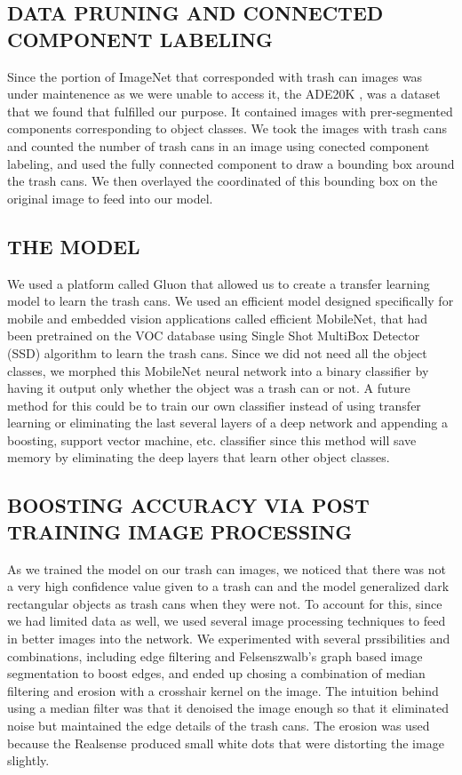 \documentclass{article}
\begin{document}
\subsection{DATA PRUNING AND CONNECTED COMPONENT LABELING}
\label{ssec:dataprune}

Since the portion of ImageNet that corresponded with trash can images was under maintenence as we were unable to access it, the ADE20K \cite{zhou2017scene}, was a dataset that we found that fulfilled our purpose. It contained images with prer-segmented components corresponding to object classes. We took the images with trash cans and counted the number of trash cans in an image using conected component labeling, and used the fully connected component to draw a bounding box around the trash cans. We then overlayed the coordinated of this bounding box on the original image to feed into our model. 

\subsection{THE MODEL}
\label{ssec:themodel}
We used a platform called Gluon \cite{gluoncvnlp2019} that allowed us to create a transfer learning model to learn the trash cans. 
We used an efficient model designed specifically for mobile and embedded vision applications called efficient MobileNet, that had been pretrained on the VOC database using Single Shot MultiBox Detector (SSD) algorithm\cite{Howard2017MobileNetsEC,Liu2016SSDSS} to learn the trash cans. 
Since we did not need all the object classes, we morphed this MobileNet neural network into a binary classifier by having it output only whether the object was a trash can or not.
A future method for this could be to train our own classifier instead of using transfer learning or eliminating the last several layers of a deep network and appending a boosting, support vector machine, etc. classifier since this method will save memory by eliminating the deep layers that learn other object classes. 

\subsection{BOOSTING ACCURACY VIA POST TRAINING IMAGE PROCESSING}
\label{ssec:boosting}

As we trained the model on our trash can images, we noticed that there was not a very high confidence value given to a trash can and the model generalized dark rectangular objects as trash cans when they were not. To account for this, since we had limited data as well, we used several image processing techniques to feed in better images into the network. We experimented with several prssibilities and combinations, including edge filtering and Felsenszwalb's graph based image segmentation to boost edges, and ended up chosing a combination of median filtering and erosion with a crosshair kernel on the image. The intuition behind using a median filter was that it denoised the image enough so that it eliminated noise but maintained the edge details of the trash cans. The erosion was used because the Realsense produced small white dots that were distorting the image slightly. 
\end{document}
